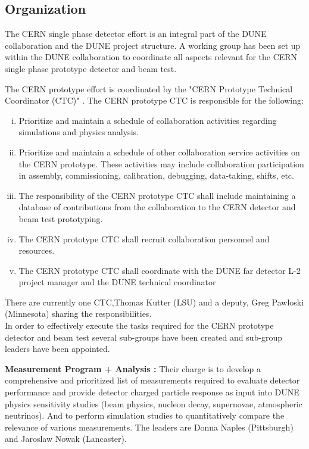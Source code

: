 \subsection{Organization}

The CERN single phase detector effort is an integral part of the DUNE collaboration and the DUNE project structure. 
A working group has been set up within the DUNE collaboration to coordinate all aspects relevant for the CERN single phase prototype detector and beam test. 

The CERN prototype effort is coordinated by the "CERN Prototype Technical Coordinator (CTC)" \cite{LBNEorg}.
The CERN prototype CTC is responsible for the following:
\begin{enumerate}[i.]
	\item Prioritize and maintain a schedule of collaboration activities regarding simulations and physics analysis. 
	\item Prioritize and maintain a schedule of other collaboration service activities on the CERN prototype.  These activities may include collaboration participation in assembly, commissioning, calibration, debugging, data-taking, shifts, etc. 
	\item The responsibility of the CERN prototype CTC shall include maintaining a database of contributions from the collaboration to the CERN detector and beam test prototyping.
	\item The CERN prototype CTC shall recruit collaboration personnel and resources.
	\item The CERN prototype CTC shall coordinate with the DUNE far detector L-2 project manager and the DUNE technical coordinator
\end{enumerate}
There are currently one CTC,Thomas Kutter (LSU)  and a deputy, Greg Pawloski (Minnesota) sharing the responsibilities.\\
 

In order to effectively execute the tasks required for the CERN prototype detector and beam test several sub-groups have been created 
and sub-group leaders have been appointed.

{\bf Measurement Program + Analysis :}   Their charge is to develop a comprehensive and prioritized list of measurements required to evaluate detector performance and provide detector charged particle response as input into DUNE physics sensitivity studies (beam physics, nucleon decay, supernovae, atmospheric neutrinos).  And to perform simulation studies to quantitatively compare the relevance of various measurements.
The leaders are Donna Naples (Pittsburgh) and Jaroslaw Nowak (Lancaster).
 
